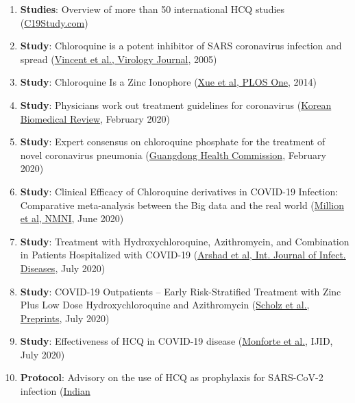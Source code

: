 \begin{enumerate}
\def\labelenumi{\arabic{enumi}.}
\tightlist
\item
  \textbf{Studies}: Overview of more than 50 international HCQ studies
  (\href{https://c19study.com/}{C19Study.com})
\item
  \textbf{Study}: Chloroquine is a potent inhibitor of SARS coronavirus
  infection and spread
  (\href{https://www.ncbi.nlm.nih.gov/pmc/articles/PMC1232869/}{Vincent
  et al., Virology Journal}, 2005)
\item
  \textbf{Study}: Chloroquine Is a Zinc Ionophore
  (\href{https://journals.plos.org/plosone/article?id=10.1371/journal.pone.0109180}{Xue
  et al, PLOS One}, 2014)
\item
  \textbf{Study}: Physicians work out treatment guidelines for
  coronavirus
  (\href{http://www.koreabiomed.com/news/articleView.html?idxno=7428}{Korean
  Biomedical Review}, February 2020)\\
\item
  \textbf{Study}: Expert consensus on chloroquine phosphate for the
  treatment of novel coronavirus pneumonia
  (\href{https://pubmed.ncbi.nlm.nih.gov/32075365/}{Guangdong Health
  Commission}, February 2020)
\item
  \textbf{Study}: Clinical Efficacy of Chloroquine derivatives in
  COVID-19 Infection: Comparative meta-analysis between the Big data and
  the real world
  (\href{https://www.sciencedirect.com/science/article/pii/S2052297520300615}{Million
  et al, NMNI}, June 2020)
\item
  \textbf{Study}: Treatment with Hydroxychloroquine, Azithromycin, and
  Combination in Patients Hospitalized with COVID-19
  (\href{https://www.henryford.com/news/2020/07/hydro-treatment-study}{Arshad
  et al, Int. Journal of Infect. Diseases}, July 2020)
\item
  \textbf{Study}: COVID-19 Outpatients -- Early Risk-Stratified
  Treatment with Zinc Plus Low Dose Hydroxychloroquine and Azithromycin
  (\href{https://www.preprints.org/manuscript/202007.0025/v1}{Scholz et
  al., Preprints}, July 2020)
\item
  \textbf{Study}: Effectiveness of HCQ in COVID-19 disease
  (\href{https://www.ijidonline.com/article/S1201-9712(20)30600-7/fulltext}{Monforte
  et al.}, IJID, July 2020)
\item
  \textbf{Protocol}: Advisory on the use of HCQ as prophylaxis for
  SARS-CoV-2 infection
  (\href{https://www.mohfw.gov.in/pdf/AdvisoryontheuseofHydroxychloroquinasprophylaxisforSARSCoV2infection.pdf}{Indian
}
\end{enumerate}
